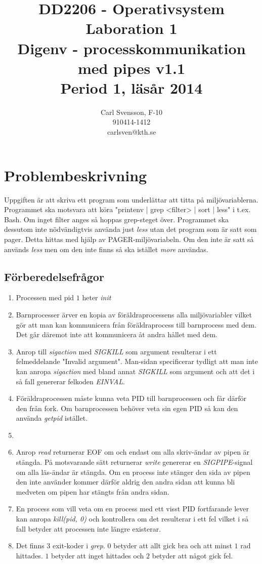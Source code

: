 \documentclass[10pt,a4paper]{article}
\title{DD2206 - Operativsystem \\ Laboration 1 \\ Digenv - processkommunikation med pipes  v1.1 \\ Period 1, läsår 2014}
\author{Carl Svensson, F-10 \\ 910414-1412 \\ carlsven@kth.se}
\date{}
\begin{document}
\maketitle
\clearpage


\section{Problembeskrivning}

Uppgiften är att skriva ett program som underlättar att titta på miljövariablerna. Programmet ska motsvara att köra "printenv | grep <filter> | sort | less" i t.ex. Bash. Om inget filter anges så hoppas grep-steget över.
Programmet ska dessutom inte nödvändigtvis använda just \emph{less} utan det program som är satt som pager. Detta hittas med hjälp av PAGER-miljövariabeln. Om den inte är satt så används \emph{less} men om den inte finns så ska istället \emph{more} användas.

\subsection{Förberedelsefrågor}

\begin{enumerate}
\item Processen med pid $1$ heter \emph{init}
\item Barnprocesser ärver en kopia av föräldraprocessens alla miljövariabler vilket gör att man kan kommunicera från föräldraprocess till barnprocess med dem. Det går däremot inte att kommunicera åt andra hållet med dem.
\item Anrop till \emph{sigaction} med \emph{SIGKILL} som argument resulterar i ett felmeddelande "Invalid argument". Man-sidan specificerar tydligt att man inte kan anropa \emph{sigaction} med bland annat \emph{SIGKILL} som argument och att det i så fall genererar felkoden \emph{EINVAL}. 
\item Föräldraprocessen måste kunna veta PID till barnprocessen och får därför den från fork. Om barnprocessen behöver veta sin egen PID så kan den använda \emph{getpid} istället.
\item 
\item Anrop \emph{read} returnerar EOF om och endast om alla skriv-ändar av pipen är stängda. På motsvarande sätt returnerar \emph{write} genererar en \emph{SIGPIPE}-signal om alla läs-ändar är stängda. Om en process inte stänger den sida av pipen den inte använder kommer därför aldrig den andra sidan att kunna bli medveten om pipen har stängts från andra sidan.
\item En process som vill veta om en process med ett visst PID fortfarande lever kan anropa \emph{kill(pid, 0)} och kontrollera om det resulterar i ett fel vilket i så fall betyder att processen inte längre existerar.
\item Det finns 3 exit-koder i \emph{grep}. $0$ betyder att allt gick bra och att minst $1$ rad hittades. $1$ betyder att inget hittades och $2$ betyder att något gick fel.
\end{enumerate}
\end{document}
